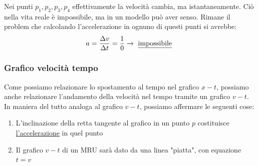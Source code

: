 \begin{minipage}[c]{0.48\textwidth}
\end{minipage}
%
\begin{minipage}[c]{0.48\textwidth}
	Nei punti $ p_1, p_2,p_3, p_4 $ effettivamente la velocità cambia, ma istantaneamente. Ciò nella vita reale è impossibile, ma in un modello può aver senso. Rimane il problem che calcolando l'accelerazione in ognuno di questi punti si avrebbe:
	\[
		a = \frac{\Delta v}{\Delta t} = \frac{1}{0} \rightarrow \text{ \underline{impossibile} }
	\]
\end{minipage}
\subsubsection{Grafico velocità tempo}
Come possiamo relazionare lo spostamento al tempo nel grafico $ x- t $, possiamo anche relazionare l'andamento della velocità nel tempo tramite un grafico $ v- t $. In maniera del tutto analoga al grafico $ v- t $, possiamo affermare le seguenti cose:
\begin{enumerate}
	\item L'inclinazione della retta tangente al grafico in un punto $ p $ costituisce \underline{l'accelerazione} in quel punto
	\item Il grafico $ v- t$ di un MRU sarà dato da una linea "piatta", con equazione $ t=v $
\end{enumerate}

